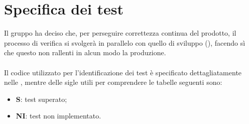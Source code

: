 \section{Specifica dei test}
Il gruppo \Gruppo{} ha deciso che, per perseguire correttezza continua del prodotto, il processo di verifica si svolgerà in parallelo con quello di sviluppo (), facendo sì che questo non rallenti in alcun modo la produzione. \\ \mbox{}\\
Il codice utilizzato per l'identificazione dei test è specificato dettagliatamente nelle , mentre delle sigle utili per comprendere le tabelle seguenti sono:

\begin{itemize}
 \item \textbf{S}: test superato;
 \item \textbf{NI}: test non implementato.
\end{itemize}








